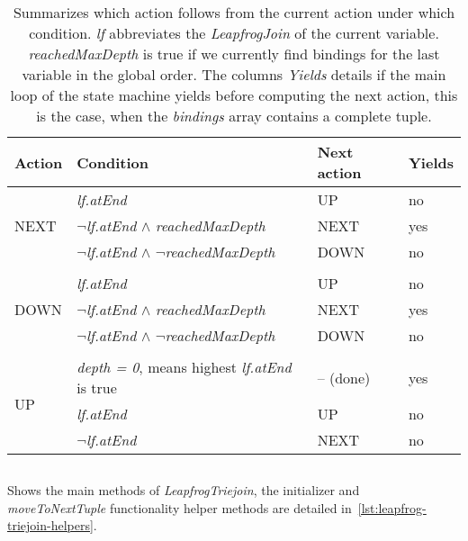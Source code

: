 \begin{table}[]
    \centering
    \begin{tabular}{@{}llll@{}}
        \toprule
        Action                & Condition                                  & Next action & Yields \\ \midrule
        \multirow{3}{*}{NEXT} & \textit{lf.atEnd}                                   & UP          & no     \\
        & \textit{$\neg$lf.atEnd} $\wedge$ \textit{reachedMaxDepth}             & NEXT        & yes    \\
        & \textit{$\neg$lf.atEnd} $\wedge$ \textit{$\neg$reachedMaxDepth}            & DOWN        & no     \\
        & & &\\
        \multirow{3}{*}{DOWN} & \textit{lf.atEnd}                                   & UP          & no     \\
        & \textit{$\neg$lf.atEnd} $\wedge$ \textit{reachedMaxDepth}             & NEXT        & yes    \\
        & \textit{$\neg$lf.atEnd} $\wedge$ \textit{$\neg$reachedMaxDepth}            & DOWN        & no     \\
        & & &\\
        \multirow{3}{*}{UP}     & \textit{depth = 0}, means highest \textit{lf.atEnd} is true & -- (done)         & yes    \\
        & \textit{lf.atEnd}                                   & UP          & no     \\
        & \textit{$\neg$lf.atEnd}                                  & NEXT        & no     \\ \bottomrule
    \end{tabular}
    \caption{Summarizes which action follows from the current action under which condition. \textit{lf} abbreviates the
    \textit{LeapfrogJoin} of the current variable.
    \textit{reachedMaxDepth} is true if we currently find bindings for the
    last variable in the global order.
    The columns \textit{Yields} details if the main loop of the state machine yields before computing the next action,
    this is the case, when the \textit{bindings} array contains a complete tuple.
    }
    \label{table:lftj-state-machine}
\end{table}

\begin{listing}[H]
    \inputminted[mathescape, linenos=true]{scala}{code/LeapfrogTriejoinIdiomatic.scala}
    \caption{Shows the main methods of \textit{LeapfrogTriejoin}, the initializer and \textit{moveToNextTuple} functionality
    helper methods are detailed in~\cref{lst:leapfrog-triejoin-helpers}.}
    \label{lst:leapfrog-triejoin}
\end{listing}

